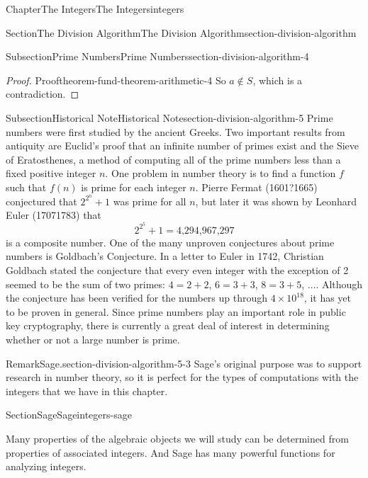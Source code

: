 \documentclass[oneside,10pt,]{book}
\numberwithin{equation}{section}
\begin{document}
\begin{chapterptx}{Chapter}{The Integers}{}{The Integers}{}{}{integers}
\begin{sectionptx}{Section}{The Division Algorithm}{}{The Division Algorithm}{}{}{section-division-algorithm}
\begin{subsectionptx}{Subsection}{Prime Numbers}{}{Prime Numbers}{}{}{section-division-algorithm-4}
\begin{proof}{Proof}{}{theorem-fund-theorem-arithmetic-4}
So \(a \notin S\), which is a contradiction.%
\end{proof}
\end{subsectionptx}
%
%
\typeout{************************************************}
\typeout{************************************************}
%
\begin{subsectionptx}{Subsection}{Historical Note}{}{Historical Note}{}{}{section-division-algorithm-5}
Prime numbers were first studied by the ancient Greeks.  Two important results from antiquity are Euclid's proof that an infinite number of primes exist and the Sieve of Eratosthenes, a method of computing all of the prime numbers less than a fixed positive integer \(n\).  One problem in number theory is to find a function \(f\) such that \(f(n)\) is prime for each integer \(n\). Pierre Fermat (1601?\textendash{}1665) conjectured that \(2^{2^n} + 1\) was prime for all \(n\), but later it was shown by Leonhard Euler (1707\textendash{}1783) that%
\begin{equation*}
2^{2^5} + 1 = \text{4,294,967,297}
\end{equation*}
is a composite number. One of the many unproven conjectures about prime numbers is Goldbach's Conjecture.  In a letter to Euler in 1742, Christian Goldbach stated the conjecture that every even integer with the exception of 2 seemed to be the sum of two primes:  \(4 = 2 + 2\), \(6 = 3 + 3\), \(8 =3 + 5\), \(\ldots\).  Although the conjecture has been verified for the numbers up through \(4 \times 10^{18}\), it has yet to be proven in general.  Since prime numbers play an important role in public key cryptography, there is currently a great deal of interest in determining whether or not a large number is prime.%
\begin{remark}{Remark}{Sage.}{section-division-algorithm-5-3}%
Sage's original purpose was to support research in number theory, so it is perfect for the types of computations with the integers that we have in this chapter.%
\end{remark}
\end{subsectionptx}
\end{sectionptx}
%
%
\typeout{************************************************}
\typeout{************************************************}
%
\begin{sectionptx}{Section}{Sage}{}{Sage}{}{}{integers-sage}
\begin{introduction}{}%
Many properties of the algebraic objects we will study can be determined from properties of associated integers.  And Sage has many powerful functions for analyzing integers.%

\end{introduction}
\end{sectionptx}
\end{chapterptx}
\end{document}

